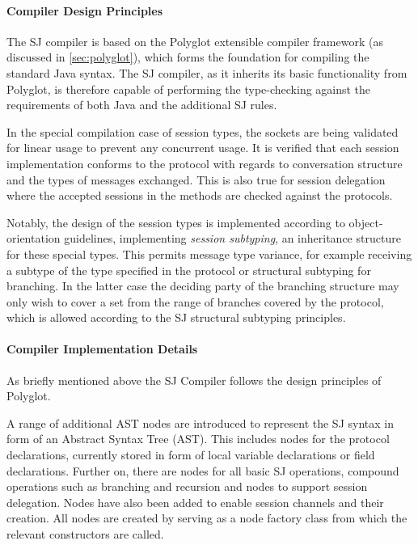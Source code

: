 \paragraph*{Compiler Design Principles}
The SJ compiler is based on the Polyglot extensible compiler framework (as discussed in \autoref{sec:polyglot}), which forms the foundation for compiling the standard Java syntax. The SJ compiler, as it inherits its basic functionality from Polyglot, is therefore capable of performing the type-checking against the requirements of both Java and the additional SJ rules. 

In the special compilation case of session types, the sockets are being validated for linear usage to prevent any concurrent usage. It is verified that each session implementation conforms to the protocol with regards to conversation structure and the types of messages exchanged. This is also true for session delegation where the accepted sessions in the methods are checked against the protocols.

Notably, the design of the session types is implemented according to object-orientation guidelines, implementing \textit{session subtyping}, an inheritance structure for these special types. This permits message type variance, for example receiving a subtype of the type specified in the protocol or structural subtyping for branching. In the latter case the deciding party of the branching structure may only wish to cover a set from the range of branches covered by the protocol, which is allowed according to the SJ structural subtyping principles.

\paragraph*{Compiler Implementation Details}
As briefly mentioned above the SJ Compiler follows the design principles of Polyglot. 

A range of additional AST nodes are introduced to represent the SJ syntax in form of an Abstract Syntax Tree (AST). This includes nodes for the protocol declarations, currently stored in form of local variable declarations or field declarations. Further on, there are nodes for all basic SJ operations, compound operations such as branching and recursion and nodes to support session delegation. Nodes have also been added to enable session channels and their creation. All nodes are created by   serving as a node factory class from which the relevant constructors are called.

